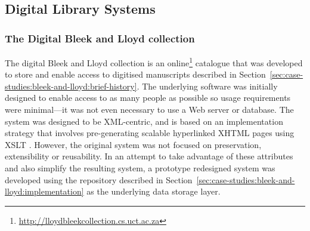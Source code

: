 






\subsection[DLSes]{Digital Library Systems}
\label{sec:case-studies:bleek-and-lloyd:use-cases}

\subsubsection{The Digital Bleek and Lloyd collection}
\label{sec:case-studies:bleek-and-lloyd:use-cases:the-digital-bleek-and-lloyd}

The digital Bleek and Lloyd collection \citep{LloydBleek2007} is an online\footnote{\url{http://lloydbleekcollection.cs.uct.ac.za}} catalogue that was developed to store and enable access to digitised manuscripts described in Section~\ref{sec:case-studies:bleek-and-lloyd:brief-history}. The underlying software was initially designed to enable access to as many people as possible so usage requirements were minimal---it was not even necessary to use a Web server or database. The system was designed to be XML-centric, and is based on an implementation strategy that involves pre-generating scalable hyperlinked XHTML pages using XSLT \citep{Suleman2007}. However, the original system was not focused on preservation, extensibility or reusability. In an attempt to take advantage of these attributes and also simplify the resulting system, a prototype redesigned system \citep{Phiri2012} was developed using the repository described in Section~\ref{sec:case-studies:bleek-and-lloyd:implementation} as the underlying data storage layer.

